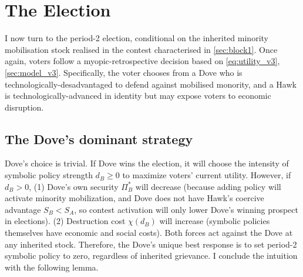 \documentclass[11pt,twoside]{extarticle}
\begin{document}
\section{The Election}\label{sec:block2}

I now turn to the period-2 election, conditional on the inherited minority mobilisation stock realised in the contest characterised in \autoref{sec:block1}. Once again, voters follow a myopic-retrospective decision based on \eqref{eq:utility_v3}, \autoref{sec:model_v3}. Specifically, the voter chooses from a Dove who is technologically-desadvantaged to defend against mobilised monority, and a Hawk is technologically-advanced in identity but may expose voters to economic disruption. 


\subsection{The Dove's dominant strategy}\label{subsec:dove_v3}

Dove's choice is trivial. If Dove wins the election, it will choose the intensity of symbolic policy strength $d_B \geq 0$ to maximize voters' current utility. However, if $d_B > 0$, (1) Dove's own security $\Pi_B^*$ will decrease (because adding policy will activate minority mobilization, and Dove does not have Hawk's coercive advantage $S_B < S_A$, so contest activation will only lower Dove's winning prospect in elections). (2) Destruction cost $\chi(d_B)$ will increase (symbolic policies themselves have economic and social costs). Both forces act against the Dove at any inherited stock. Therefore, the Dove's unique best response is to set period-2 symbolic policy to zero, regardless of inherited grievance. I conclude the intuition with the following lemma.

\end{document}
